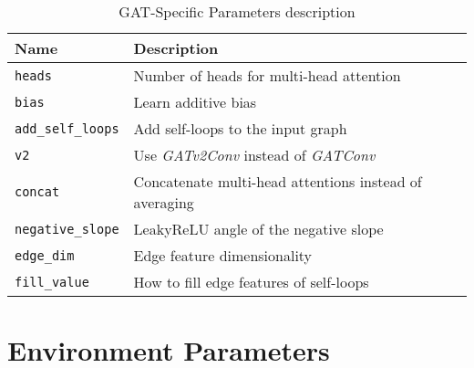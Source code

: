 \begin{table}[H]
	\centering
	\caption{\ac{GAT}-Specific Parameters description}
	\begin{tabularx}{\textwidth}{lX}
		\toprule
		\textbf{Name} & \textbf{Description} \\
		\midrule
				
		\texttt{heads} & Number of heads for multi-head attention \\
		\texttt{bias} & Learn additive bias \\
		\texttt{add\_self\_loops} & Add self-loops to the input graph \\
		\texttt{v2} & Use \textit{GATv2Conv} instead of \textit{GATConv} \\
		\texttt{concat} & Concatenate multi-head attentions instead of averaging \\
		\texttt{negative\_slope} & LeakyReLU angle of the negative slope \\
		\texttt{edge\_dim} & Edge feature dimensionality \\
		\texttt{fill\_value} & How to fill edge features of self-loops \\
		\bottomrule
	\end{tabularx}
	\label{tab:gat-params}
\end{table}


\section{Environment Parameters}

